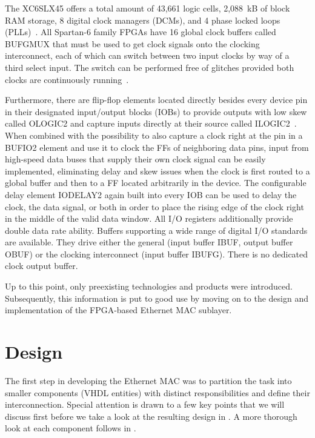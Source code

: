 \documentclass[a4paper, 11pt, oneside]{Thesis}  %
\begin{document}
The XC6SLX45 offers a total amount of 43,661 logic cells, 2,088~kB of block RAM storage, 8 digital clock managers (DCMs), and 4 phase locked loops (PLLs)~\cite{S6Family}. All Spartan-6 family FPGAs have 16 global clock buffers called BUFGMUX that must be used to get clock signals onto the clocking interconnect, each of which can switch between two input clocks by way of a third select input. The switch can be performed free of glitches provided both clocks are continuously running~\cite{S6Clocking}.

Furthermore, there are flip-flop elements located directly besides every device pin in their designated input/output blocks (IOBs) to provide outputs with low skew called OLOGIC2 and capture inputs directly at their source called ILOGIC2~\cite{S6SelectIO}. When combined with the possibility to also capture a clock right at the pin in a BUFIO2 element and use it to clock the FFs of neighboring data pins, input from high-speed data buses that supply their own clock signal can be easily implemented, eliminating delay and skew issues when the clock is first routed to a global buffer and then to a FF located arbitrarily in the device. The configurable delay element IODELAY2 again built into every IOB can be used to delay the clock, the data signal, or both in order to place the rising edge of the clock right in the middle of the valid data window. All I/O registers additionally provide double data rate ability. Buffers supporting a wide range of digital I/O standards are available. They drive either the general (input buffer IBUF, output buffer OBUF) or the clocking interconnect (input buffer IBUFG). There is no dedicated clock output buffer.

Up to this point, only preexisting technologies and products were introduced. Subsequently, this information is put to good use by moving on to the design and implementation of the FPGA-based Ethernet MAC sublayer.

\chapter{Design}\label{ch:design}

The first step in developing the Ethernet MAC was to partition the task into smaller components (VHDL entities) with distinct responsibilities and define their interconnection. Special attention is drawn to a few key points that we will discuss first before we take a look at the resulting design in . A more thorough look at each component follows in .
\end{document}
